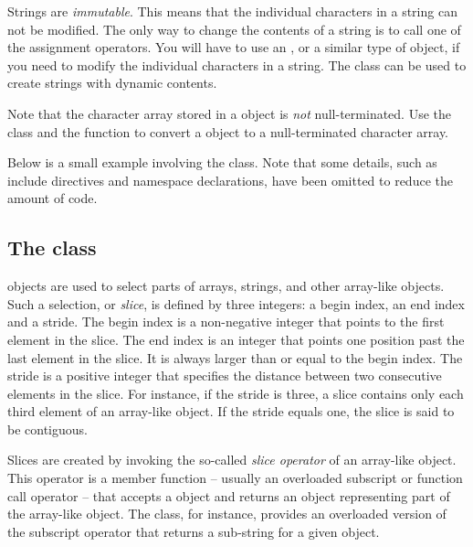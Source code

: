 Strings are \emph{immutable}. This means that the individual characters
in a string can not be modified. The only way to change the contents of a
string is to call one of the assignment operators. You will have to use
an , or a similar type of object, if you need to modify the
individual characters in a string. The  class can be
used to create strings with dynamic contents.

Note that the character array stored in a  object is
\emph{not} null-terminated. Use the  class and the
 function to convert a  object to a
null-terminated character array.

Below is a small example involving the  class. Note that
some details, such as include directives and namespace declarations, have
been omitted to reduce the amount of code.



\subsection*{The  class}

 objects are used to select parts of arrays, strings, and
other array-like objects. Such a selection, or \emph{slice}, is defined
by three integers: a begin index, an end index and a stride. The begin
index is a non-negative integer that points to the first element in the
slice. The end index is an integer that points one position past the last
element in the slice. It is always larger than or equal to the begin
index. The stride is a positive integer that specifies the distance
between two consecutive elements in the slice. For instance, if the
stride is three, a slice contains only each third element of an
array-like object. If the stride equals one, the slice is said to be
contiguous.

Slices are created by invoking the so-called \emph{slice operator} of an
array-like object. This operator is a member function -- usually an
overloaded subscript or function call operator -- that accepts a
 object and returns an object representing part of the
array-like object. The  class, for instance, provides an
overloaded version of the subscript operator that returns a sub-string
for a given  object.

